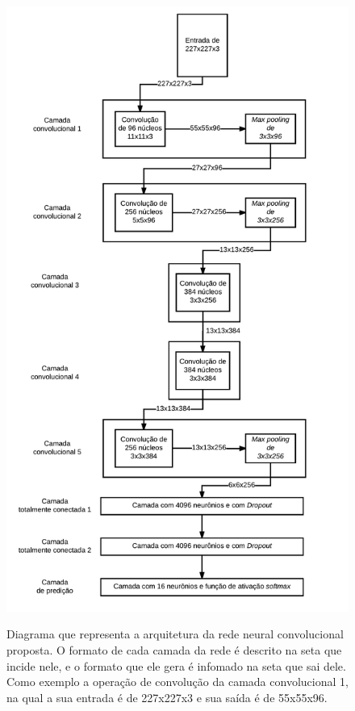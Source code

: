 \begin{figure}[H]
  \centering
  \caption{Diagrama que representa a arquitetura da rede neural convolucional proposta. O formato de cada camada da rede é descrito na seta que incide nele, e o formato que ele gera é infomado na seta que sai dele. Como exemplo a operação de convolução da camada convolucional 1, na qual a sua entrada é de 227x227x3 e sua saída é de 55x55x96.}
  \includegraphics[width=350pt]{dados/figuras/dia_rede}
  \label{fig:arqrede}
\end{figure}

